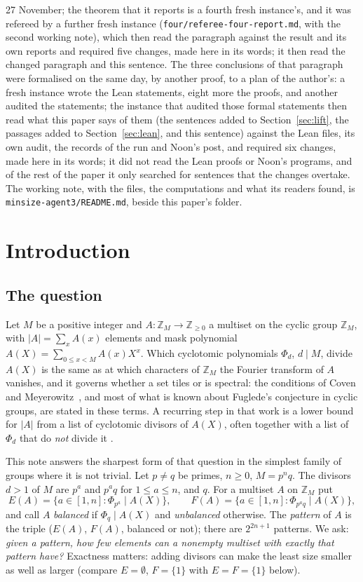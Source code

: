 \documentclass[11pt,a4paper]{amsart}
\theoremstyle{definition}
\theoremstyle{remark}
\newcommand{\Z}{\mathbb{Z}}
\begin{document}
{{27 November; the theorem that it reports is a fourth fresh instance's, and it was refereed by a further fresh instance
(\texttt{four/referee-four-report.md}, with the second working note), which then read the paragraph against the result
and its own reports and required five changes, made here in its words; it then read the changed paragraph and this sentence. The three conclusions of that paragraph were formalised on the same day, by another proof, to a plan of the author's: a fresh instance wrote the Lean statements, eight more the proofs, and another audited the statements; the instance that audited those formal statements then read what this paper says of them (the sentences added to Section~\ref{sec:lift}, the passages added to Section~\ref{sec:lean}, and this sentence) against the Lean files, its own audit, the records of the run and Noon's post, and required six changes, made here in its words; it did not read the Lean proofs or Noon's programs, and of the rest of the paper it only searched for sentences that the changes overtake. The working note,
with the files, the computations and what its readers found, is \texttt{minsize-agent3/README.md}, beside this paper's folder.}}

\section{Introduction}

\subsection{The question} Let $M$ be a positive integer and $A\colon\Z_M\to\Z_{\ge 0}$ a multiset on the
cyclic group $\Z_M$, with $|A|=\sum_x A(x)$ elements and mask polynomial $A(X)=\sum_{0\le x<M}A(x)X^x$. Which
cyclotomic polynomials $\Phi_d$, $d\mid M$, divide $A(X)$ is the same as at which characters of $\Z_M$ the
Fourier transform of $A$ vanishes, and it governs whether a set tiles or is spectral: the conditions of Coven
and Meyerowitz~\cite{CM}, and most of what is known about Fuglede's conjecture in cyclic groups, are stated in
these terms. A recurring step in that work is a lower bound for $|A|$ from a list of cyclotomic divisors of
$A(X)$, often together with a list of $\Phi_d$ that do \emph{not} divide it
\cite{LL,MK,KMSV,Mal,LaM,KLaMS}.

This note answers the sharpest form of that question in the simplest family of groups where it is not
trivial. Let $p\ne q$ be primes, $n\ge 0$, $M=p^nq$. The divisors $d>1$ of $M$ are $p^a$ and $p^aq$ for
$1\le a\le n$, and $q$. For a multiset $A$ on $\Z_M$ put
\[ E(A)=\{a\in[1,n]:\Phi_{p^a}\mid A(X)\},\qquad F(A)=\{a\in[1,n]:\Phi_{p^aq}\mid A(X)\}, \]
and call $A$ \emph{balanced} if $\Phi_q\mid A(X)$ and \emph{unbalanced} otherwise. The \emph{pattern} of $A$
is the triple ($E(A)$, $F(A)$, balanced or not); there are $2^{2n+1}$ patterns. We ask: \emph{given a pattern,
how few elements can a nonempty multiset with exactly that pattern have?} Exactness matters: adding divisors
can make the least size smaller as well as larger (compare $E=\emptyset$, $F=\{1\}$ with $E=F=\{1\}$ below).
\end{document}

